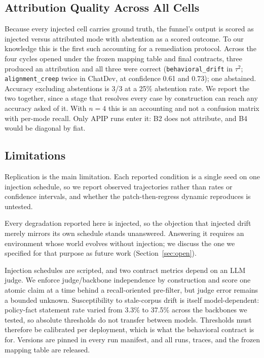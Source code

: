 \documentclass[conference]{IEEEtran}
\newcommand{\code}[1]{\texttt{\small #1}}
\begin{document}
\subsection{Attribution Quality Across All Cells}
\label{sec:attrquality}

Because every injected cell carries ground truth, the funnel's output is scored
as injected versus attributed mode with abstention as a scored outcome. To our
knowledge this is the first such accounting for a remediation protocol. Across
the four cycles opened under the frozen mapping table and final contracts,
three produced an attribution and all three were correct
(\code{behavioral\_drift} in $\tau^2$; \code{alignment\_creep} twice in
ChatDev, at confidence 0.61 and 0.73); one abstained. Accuracy excluding
abstentions is 3/3 at a 25\% abstention rate. We report the two together, since
a stage that resolves every case by construction can reach any accuracy asked
of it. With $n=4$ this is an accounting and not a confusion matrix with
per-mode recall. Only APIP runs enter it: B2 does not attribute, and B4 would
be diagonal by fiat.

\subsection{Limitations}
\label{sec:limitations}

Replication is the main limitation. Each reported condition is a single seed on
one injection schedule, so we report observed trajectories rather than rates or
confidence intervals, and whether the patch-then-regress dynamic reproduces is
untested.

Every degradation reported here is injected, so the objection that injected
drift merely mirrors its own schedule stands unanswered. Answering it requires
an environment whose world evolves without injection; we discuss the one we
specified for that purpose as future work (Section~\ref{sec:open}).

Injection schedules are scripted, and two contract metrics depend on an LLM
judge. We enforce judge/backbone independence by construction and score one
atomic claim at a time behind a recall-oriented pre-filter, but judge error
remains a bounded unknown. Susceptibility to stale-corpus drift is itself
model-dependent: policy-fact statement rate varied from 3.3\% to 37.5\% across
the backbones we tested, so absolute thresholds do not transfer between models.
Thresholds must therefore be calibrated per deployment, which is what the
behavioral contract is for. Versions are pinned in every run manifest, and all
runs, traces, and the frozen mapping table are released.
\end{document}
